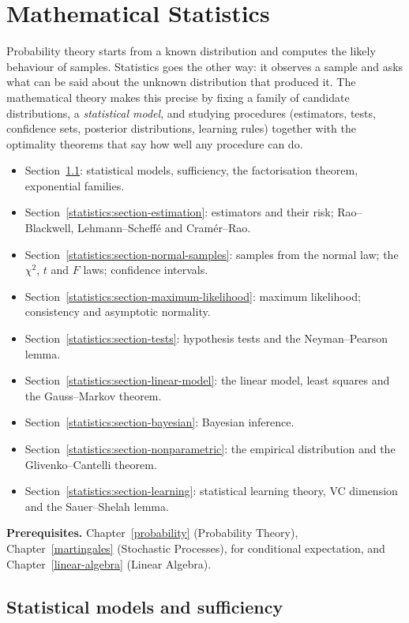 \chapter{Mathematical Statistics}\label{statistics}

Probability theory starts from a known distribution and computes the likely behaviour of samples. Statistics goes the other way: it observes a sample and asks what can be said about the unknown distribution that produced it.
The mathematical theory makes this precise by fixing a family of candidate distributions, a \emph{statistical model}, and studying procedures (estimators, tests, confidence sets, posterior distributions, learning rules)
together with the optimality theorems that say how well any procedure can do.
\begin{itemize}
\item Section~\ref{statistics:section-models}: statistical models, sufficiency, the factorisation theorem, exponential families.
\item Section~\ref{statistics:section-estimation}: estimators and their risk; Rao--Blackwell, Lehmann--Scheff\'e and Cram\'er--Rao.
\item Section~\ref{statistics:section-normal-samples}: samples from the normal law; the $\chi^2$, $t$ and $F$ laws; confidence intervals.
\item Section~\ref{statistics:section-maximum-likelihood}: maximum likelihood; consistency and asymptotic normality.
\item Section~\ref{statistics:section-tests}: hypothesis tests and the Neyman--Pearson lemma.
\item Section~\ref{statistics:section-linear-model}: the linear model, least squares and the Gauss--Markov theorem.
\item Section~\ref{statistics:section-bayesian}: Bayesian inference.
\item Section~\ref{statistics:section-nonparametric}: the empirical distribution and the Glivenko--Cantelli theorem.
\item Section~\ref{statistics:section-learning}: statistical learning theory, VC dimension and the Sauer--Shelah lemma.
\end{itemize}

\noindent\textbf{Prerequisites.} Chapter~\ref{probability} (Probability Theory), Chapter~\ref{martingales} (Stochastic Processes), for conditional expectation, and Chapter~\ref{linear-algebra} (Linear Algebra).

\section{Statistical models and sufficiency}\label{statistics:section-models}

